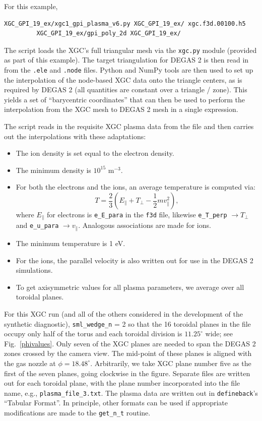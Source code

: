 \documentclass[12pt]{report}
\begin{document}
  For this example,
\begin{verbatim}
XGC_GPI_19_ex/xgc1_gpi_plasma_v6.py XGC_GPI_19_ex/ xgc.f3d.00100.h5 
         XGC_GPI_19_ex/gpi_poly_2d XGC_GPI_19_ex/
\end{verbatim}

The script loads the XGC's full triangular mesh via the {\tt xgc.py} module
(provided as part of this example).  The target triangulation for DEGAS 2
is then read in from the {\tt .ele}
and {\tt .node} files.  Python and NumPy tools are then used to set
up the interpolation of the node-based XGC data onto the triangle centers,
as is required by DEGAS 2 (all quantities are constant over a triangle / zone).
This yields a set of ``barycentric coordinates''
that can then be used to perform the interpolation from the XGC mesh to
DEGAS 2 mesh in a single expression.

The script reads in the requisite XGC plasma data from the file and
then carries out the interpolations with these adaptations:
\begin{itemize}
\item The ion density is set equal to the electron density.
\item The minimum density is $10^{15}$ m$^{-3}$.
  \item For both the electrons and the ions, an average temperature is computed via:
\begin{equation}
  T = \frac{2}{3}(E_{\parallel} + T_{\perp}
  - \frac{1}{2} m v_{\parallel}^{2}),
\end{equation}
where $E_{\parallel}$ for electrons is {\tt e\_E\_para} in the {\tt f3d} file, likewise
{\tt e\_T\_perp} $\rightarrow T_{\perp}$ and {\tt e\_u\_para} $\rightarrow v_{\parallel}$.
Analogous associations are made for ions.
\item The minimum temperature is 1 eV.
  \item For the ions, the parallel velocity is also written out for use in the
    DEGAS 2 simulations.
  \item To get axisymmetric values for all plasma parameters, we average over
    all toroidal planes.
  \end{itemize}

For this XGC run (and all of the others considered in the development of
the synthetic diagnostic), {\tt sml\_wedge\_n} = 2 so that the 16 toroidal
planes in the file occupy only half of the torus and each toroidal division
is $11.25^{\circ}$ wide; see Fig.~\ref{phivalues}.  
Only seven of the XGC planes are needed
to span the DEGAS 2 zones crossed by the camera view.
The mid-point of these planes is aligned with the
gas nozzle at $\phi = 18.48^{\circ}$.  Arbitrarily, we take XGC plane
number five as the first of the seven planes, going clockwise in the figure.
Separate files are written out for each toroidal plane,
with the plane number incorporated into the file name,
e.g., {\tt plasma\_file\_3.txt}.  The
plasma data are written out in {\tt defineback}'s ``Tabular Format''.
In principle, other formats
can be used if appropriate modifications are made to the 
{\tt get\_n\_t} routine.  
\end{document}
